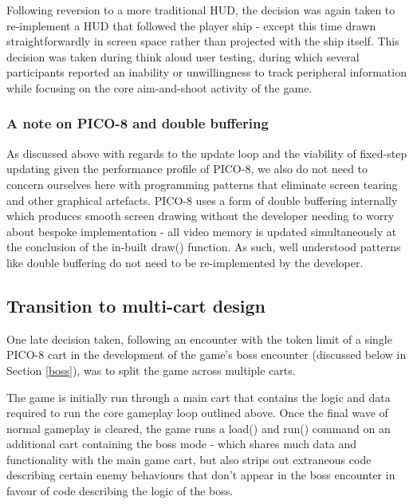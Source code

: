 \documentclass[11pt]{article}
\begin{document}
Following reversion to a more traditional HUD, the decision was again taken to re-implement a
HUD that followed the player ship - except this time drawn straightforwardly in screen space
rather than projected with the ship itself. This decision was taken during think aloud user testing,
during which several participants reported an inability or unwillingness to track peripheral
information while focusing on the core aim-and-shoot activity of the game.

\subsubsection*{A note on PICO-8 and double buffering}

As discussed above with regards to the update loop and the viability of fixed-step updating given
the performance profile of PICO-8, we also do not need to concern ourselves here with programming
patterns that eliminate screen tearing and other graphical artefacts. PICO-8 uses a form of double
buffering internally which produces smooth screen drawing without the developer needing to worry about
bespoke implementation - all video memory is updated simultaneously at the conclusion of the
in-built \textunderscore draw() function. As such, well understood patterns like double
buffering\cite[p. 107]{nystrom} do not need to be re-implemented by the developer.

\subsection{Transition to multi-cart design}\label{multicart}

One late decision taken, following an encounter with the token limit of a single PICO-8 cart
in the development of the game's boss encounter (discussed below in Section \ref{boss}), was to
split the game across multiple carts.

The game is initially run through a main cart that contains the logic and data required to
run the core gameplay loop outlined above. Once the final wave of normal gameplay is cleared,
the game runs a load() and run() command on an additional cart containing the boss mode - which
shares much data and functionality with the main game cart, but also strips out extraneous
code describing certain enemy behaviours that don't appear in the boss encounter in favour of
code describing the logic of the boss.
\end{document}
